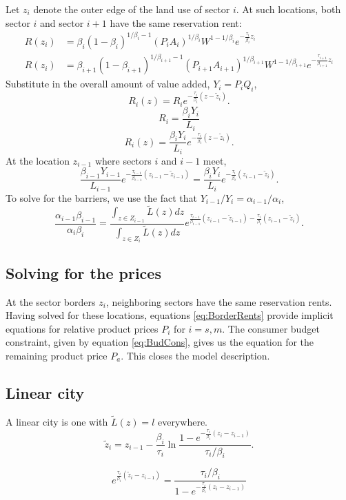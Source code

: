\documentclass[12pt]{article}
\begin{document}
Let $z_i$ denote the outer edge of the land use of sector $i$. At such locations, both sector $i$ and sector $i+1$ have the same reservation rent:
\begin{align}\label{eq:BorderRents}
R(z_i) &=\beta_i(1-\beta_i)^{1/\beta_i-1} (P_iA_i)^{1/\beta_i} W^{1-1/\beta_i} e^{-\frac{\tau_i}{\beta_i} z_i}\\
R(z_i) &=\beta_{i+1}(1-\beta_{i+1})^{1/\beta_{i+1}-1} (P_{i+1}A_{i+1})^{1/\beta_{i+1}} W^{1-1/\beta_{i+1}} e^{-\frac{\tau_{i+1}}{\beta_{i+1}} z_i}
\end{align}
Substitute in the overall amount of value added, $Y_i = P_iQ_i$,
\[
R_i(z) = R_i e^{-\frac{\tau_i}{\beta_i}(z-\tilde z_i)}.
\]
\[
R_i = \frac{\beta_i Y_i}{L_i}
\]
\[
R_i(z) = \frac{\beta_i Y_i}{L_i} e^{-\frac{\tau_i}{\beta_i}(z-\tilde z_i)}.
\]
At the location $z_{i-1}$ where sectors $i$ and $i-1$ meet,
\[
\frac{\beta_{i-1} Y_{i-1}}{L_{i-1}}
  e^{-\frac{\tau_{i-1}}{\beta_{i-1}}(z_{i-1}-\tilde z_{i-1})} =
\frac{\beta_i Y_i}{L_i}
  e^{-\frac{\tau_i}{\beta_i}(z_{i-1} -\tilde z_i)}.
\]
To solve for the barriers, we use the fact that $Y_{i-1}/Y_i = \alpha_{i-1}/\alpha_i$,
\[
\frac{\alpha_{i-1}\beta_{i-1} }
{\alpha_i \beta_i}
=
\frac{\int_{z\in Z_{i-1}} \tilde L(z) dz}
{\int_{z\in Z_{i}} \tilde L(z) dz}
  e^{\frac{\tau_{i-1}}{\beta_{i-1}}(z_{i-1}-\tilde z_{i-1})-\frac{\tau_i}{\beta_i}(z_{i-1} -\tilde z_i)}.
\]



\subsection{Solving for the prices}

At the sector borders $z_i$, neighboring sectors have the same reservation rents. Having solved for these locations, equations \ref{eq:BorderRents} provide implicit equations for relative product prices $P_i$ for $i=s,m.$ The consumer budget constraint, given by equation \ref{eq:BudCons}, gives us the equation for the remaining product price $P_a$. This closes the model description.   


\subsection{Linear city}
A linear city is one with $\tilde L(z) = l$ everywhere. 
\[
\tilde z_i = z_{i-1} - \frac{\beta_i}{\tau_i}
\ln
\frac{1-e^{-\frac{\tau_i}{\beta_i} (z_{i} - z_{i-1}) }}
{\tau_i/\beta_i}.
\]

\[
e^{\frac{\tau_i}{\beta_i}(\tilde z_i - z_{i-1} )}
=
\frac
{\tau_i/\beta_i}
{1-e^{-\frac{\tau_i}{\beta_i} (z_{i} - z_{i-1}) }}
\]
\end{document}
